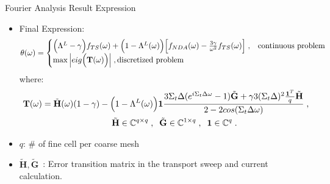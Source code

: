 \begin{frame}{Fourier Analysis Result Expression}
\begin{itemize}
\vspace{-0.5em}
    \item Final Expression:
    \begin{align}\label{eqns:four-theta}
     \theta(\omega)=
        \begin{cases}
        \Big( \Lambda^L-\gamma \Big)f_{TS}(\omega)
        +\Big( 1-\Lambda^L(\omega) \Big)\Big[ f_{NDA}(\omega)-\frac{3\gamma}{\omega^2}f_{TS}(\omega) \Big] \;, &\text{continuous problem}\\
            \max \Big| eig\Big( \mathbf{T}(\omega) \Big) \Big|\;, \text{discretized problem}
        \end{cases}
\end{align}
    where:
\vspace{-1em}
    \begin{align}
   \mathbf{T}(\omega)=\tilde{\mathbf{H}}(\omega)(1-\gamma)-\Big( 1&-\Lambda^L(\omega) \Big)\mathbf{1}\frac{3\Sigma_t\Delta(e^{i\Sigma_t\Delta\omega}-1)\tilde{\mathbf{G}}+\gamma3(\Sigma_t\Delta)^2\frac{\mathbf{1}^T}{q}\tilde{\mathbf{H}}}{2-2cos(\Sigma_t\Delta\omega)}  \label{eq:eror_tr_mtx} \;, \\
    \tilde{\mathbf{H}}&\in\mathbb{C}^{q \times q}\;, \;\; \tilde{\mathbf{G}}\in\mathbb{C}^{1 \times q}\; ,\;\; {\mathbf{1}}\in\mathbb{C}^q\;.
    \end{align}
\item $q$: \# of fine cell per coarse mesh
\item $\tilde{\mathbf{H}},\tilde{\mathbf{G}}$~: Error transition matrix in the transport sweep and current calculation.
\end{itemize}
\end{frame}
